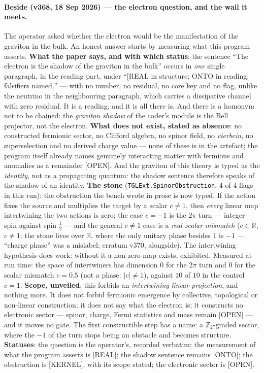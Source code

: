 \documentclass[11pt]{article}
\theoremstyle{definition}\newtheorem{deriv}{Derivation}
\begin{document}
\paragraph*{Beside (v368, 18 Sep 2026) --- the electron question, and the wall it meets.} The operator asked whether the electron would be the manifestation of the graviton in the bulk. An honest answer starts by measuring what this program asserts. \textbf{What the paper says, and with which status}: the sentence ``The electron is the shadow of the graviton in the bulk'' occurs in \emph{one} single paragraph, in the reading part, under ``[REAL in structure; ONTO in reading; falsifiers named]'' --- with no number, no residual, no core key and no flag, unlike the neutrino in the neighbouring paragraph, which carries a dissipative channel with zero residual. It is a reading, and it is all there is. And there is a homonym not to be chained: the \emph{graviton shadow} of the coder's module is the Bell projector, not the electron. \textbf{What does not exist, stated as absence}: no constructed fermionic sector, no Clifford algebra, no spinor field, no \emph{vierbein}, no superselection and no derived charge value --- none of these is in the artefact; the program itself already names genuinely interacting matter with fermions and anomalies as a remainder [OPEN]. And the graviton of this theory is typed as the \emph{identity}, not as a propagating quantum: the shadow sentence therefore speaks of the shadow of an identity. \textbf{The stone} (\texttt{TGLExt.SpinorObstruction}, 4 of 4 flags in this run): the obstruction the bench wrote in prose is now typed. If the action fixes the source and multiplies the target by a scalar $c\neq1$, then \emph{every} linear map intertwining the two actions is zero; the case $c=-1$ is the $2\pi$ turn --- integer spin against spin $\tfrac{1}{2}$ --- and the general $c\neq1$ case is a \emph{real scalar mismatch} ($c\in\mathbb{R}$, $c\neq1$; the stone lives over $\mathbb{R}$, where the only unitary phase besides $1$ is $-1$ --- ``charge phase'' was a mislabel; erratum v370, alongside). The intertwining hypothesis does work: without it a non-zero map exists, exhibited. Measured at run time: the space of intertwiners has dimension $0$ for the $2\pi$ turn and $0$ for the scalar mismatch $c=0.5$ (not a phase: $|c|\neq1$), against $10$ of $10$ in the control $c=1$. \textbf{Scope, unveiled}: this forbids an \emph{intertwining linear projection}, and nothing more. It does not forbid fermionic emergence by collective, topological or non-linear construction; it does not say what the electron is; it constructs no electronic sector --- spinor, charge, Fermi statistics and mass remain [OPEN] --- and it moves no gate. The first constructible step has a name: a $\mathbb{Z}_2$-graded sector, where the $-1$ of the turn stops being an obstacle and becomes structure. \textbf{Statuses}: the question is the operator's, recorded verbatim; the measurement of what the program asserts is [REAL]; the shadow sentence remains [ONTO]; the obstruction is [KERNEL], with its scope stated; the electronic sector is [OPEN].
\end{document}
